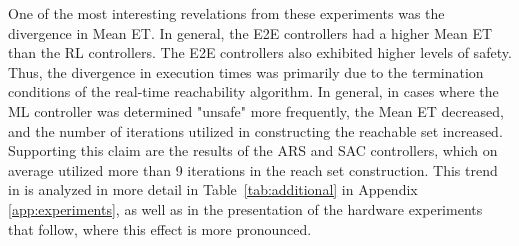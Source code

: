 \documentclass[manuscript,screen,review]{acmart}
\newcommand{\todo}[1]{\textcolor{red}{\textbf{\underline{TODO:}} #1}}
\begin{document}


One of the most interesting revelations from these experiments was the divergence in Mean ET. In general, the E2E controllers had a higher Mean ET than the RL controllers. The E2E controllers
also exhibited higher levels of safety. Thus, the divergence in execution times was primarily due to the termination conditions of the real-time reachability algorithm. In general, in cases where the ML controller was determined "unsafe" more frequently, the Mean ET decreased, and the number of iterations utilized in constructing the reachable set increased. Supporting this claim are the results of the ARS and SAC controllers, which on average utilized more than 9 iterations in the reach set construction. This trend in is analyzed in more detail in Table~\ref{tab:additional} in Appendix \ref{app:experiments}, as well as in the presentation of the hardware experiments that follow, where this effect is more pronounced.


\end{document}
